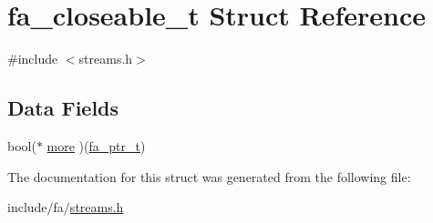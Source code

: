 \hypertarget{structfa__closeable__t}{\section{fa\-\_\-closeable\-\_\-t Struct Reference}
\label{structfa__closeable__t}
}


{\ttfamily \#include $<$streams.\-h$>$}

\subsection*{Data Fields}
\begin{DoxyCompactItemize}
\item 
bool($\ast$ \hyperlink{group___fa_gaa761cbe4aab94e2e7f2e953ebebae22e}{more} )(\hyperlink{group___fa_ga915ddeae99ad7568b273d2b876425197}{fa\-\_\-ptr\-\_\-t})
\end{DoxyCompactItemize}


The documentation for this struct was generated from the following file\-:\begin{DoxyCompactItemize}
\item 
include/fa/\hyperlink{streams_8h}{streams.\-h}\end{DoxyCompactItemize}
